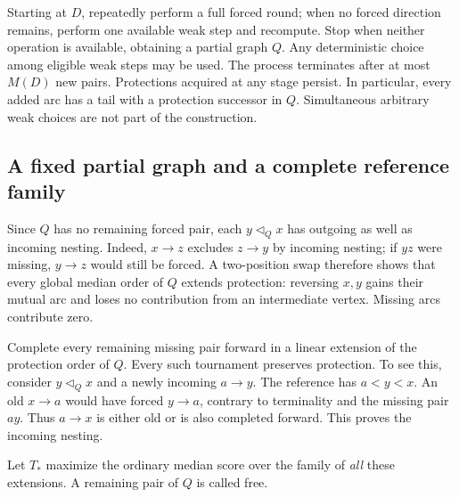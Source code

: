 Starting at $D$, repeatedly perform a full forced round; when no forced
direction remains, perform one available weak step and recompute.
Stop when neither operation is available, obtaining a partial graph $Q$.
Any deterministic choice among eligible weak steps may be used.
The process terminates after at most $M(D)$ new pairs. Protections acquired
at any stage persist. In particular, every added arc has a tail with a
protection successor in $Q$. Simultaneous arbitrary weak choices are not
part of the construction.

\subsection{A fixed partial graph and a complete reference family}
Since $Q$ has no remaining forced pair, each $y\triangleleft_Q x$ has
outgoing as well as incoming nesting. Indeed, $x\to z$ excludes $z\to y$
by incoming nesting; if $yz$ were missing, $y\to z$ would still be forced.
A two-position swap therefore shows that every global median order of $Q$
extends protection: reversing $x,y$ gains their mutual arc and loses no
contribution from an intermediate vertex. Missing arcs contribute zero.

Complete every remaining missing pair forward in a linear extension of
the protection order of $Q$. Every such tournament preserves protection.
To see this, consider $y\triangleleft_Q x$ and a newly incoming $a\to y$.
The reference has $a<y<x$. An old $x\to a$ would have forced $y\to a$,
contrary to terminality and the missing pair $ay$. Thus $a\to x$ is either
old or is also completed forward. This proves the incoming nesting.

Let $T_*$ maximize the ordinary median score over the family of
\emph{all} these extensions. A remaining pair of $Q$ is called free.

